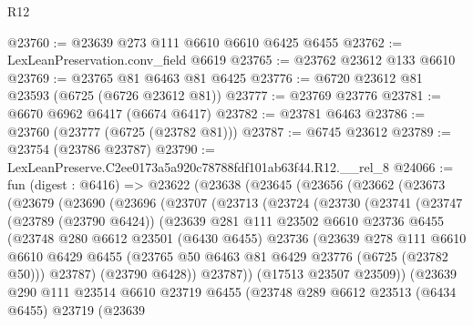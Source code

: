 \begin{lexlean}{R12}
\begin{coremodule}
@23760 := @23639 @273 @111 @6610 @6610 @6425 @6455
@23762 := LexLeanPreservation.conv_field @6619
@23765 := @23762 @23612 @133 @6610
@23769 := @23765 @81 @6463 @81 @6425
@23776 := @6720 @23612 @81 @23593 (@6725 (@6726 @23612 @81))
@23777 := @23769 @23776
@23781 := @6670 @6962 @6417 (@6674 @6417)
@23782 := @23781 @6463
@23786 := @23760 (@23777 (@6725 (@23782 @81)))
@23787 := @6745 @23612
@23789 := @23754 (@23786 @23787)
@23790 := LexLeanPreserve.C2ee0173a5a920c78788fdf101ab63f44.R12.__rel_8
@24066 := fun (digest : @6416) =>
  @23622
    (@23638
      (@23645
        (@23656
          (@23662
            (@23673
              (@23679
                (@23690
                  (@23696
                    (@23707
                      (@23713
                        (@23724
                          (@23730
                            (@23741
                              (@23747
                                (@23789 (@23790 @6424))
                                (@23639
                                  @281
                                  @111
                                  @23502
                                  @6610
                                  @23736
                                  @6455
                                  (@23748
                                    @280
                                    @6612
                                    @23501
                                    (@6430 @6455)
                                    @23736
                                    (@23639
                                      @278
                                      @111
                                      @6610
                                      @6610
                                      @6429
                                      @6455
                                      (@23765 @50 @6463 @81 @6429 @23776 (@6725 (@23782 @50)))
                                      @23787)
                                    (@23790 @6428))
                                  @23787))
                              (@17513 @23507 @23509))
                            (@23639
                              @290
                              @111
                              @23514
                              @6610
                              @23719
                              @6455
                              (@23748
                                @289
                                @6612
                                @23513
                                (@6434 @6455)
                                @23719
                                (@23639

\end{coremodule}
\end{lexlean}

